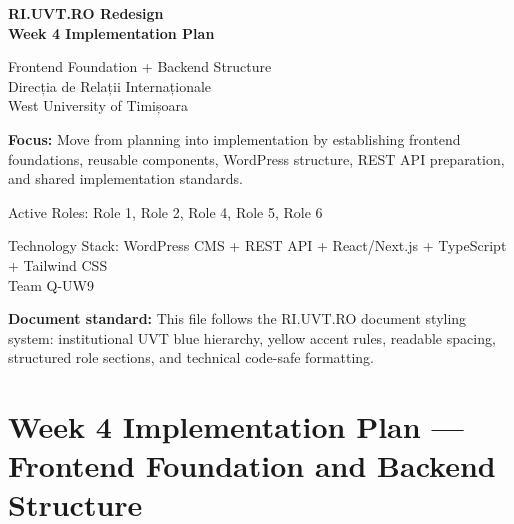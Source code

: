 \documentclass[12pt,a4paper]{article}
\begin{document}
\begin{titlepage}
    \pagecolor{uvtDarkBlue}
    \color{white}

    \vspace*{2cm}

    {\Huge\bfseries RI.UVT.RO Redesign\\[0.25em]
    Week 4 Implementation Plan\par}

    \vspace{0.8cm}

    {\Large Frontend Foundation + Backend Structure\\
    Direcția de Relații Internaționale\\
    West University of Timișoara\par}

    \vspace{1.5cm}

    \begin{yellowbox}
        \color{textGray}
        \textbf{Focus:} Move from planning into implementation by establishing frontend foundations, reusable components, WordPress structure, REST API preparation, and shared implementation standards.
    \end{yellowbox}

    \vspace{0.8cm}
    {\large Active Roles: Role 1, Role 2, Role 4, Role 5, Role 6\par}

    \vfill

    {\large Technology Stack: WordPress CMS + REST API + React/Next.js + TypeScript + Tailwind CSS\\
    Team Q-UW9}

    \vspace{1cm}
\end{titlepage}

\nopagecolor
\color{textGray}

\tableofcontents
\newpage

\begin{infobox}
\textbf{Document standard:} This file follows the RI.UVT.RO document styling system: institutional UVT blue hierarchy, yellow accent rules, readable spacing, structured role sections, and technical code-safe formatting.
\end{infobox}

\section{Week 4 Implementation Plan --- Frontend Foundation and Backend Structure}\label{week-4-implementation-plan-frontend-foundation-and-backend-structure}
\end{document}
